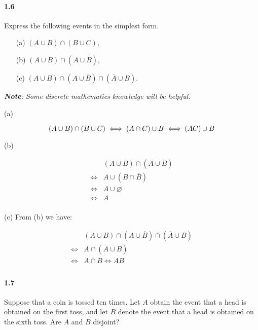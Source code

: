 \paragraph{1.6}
Express the following events in the simplest form.
\begin{itemize}
    \item[(a)] $(A\cup B)\cap (B\cup C)$,
    \item[(b)] $(A\cup B)\cap (A\cup \overline{B})$,
    \item[(c)] $(A\cup B)\cap (A\cup \overline{B})\cap (\overline{A}\cup B)$.
\end{itemize}

\begin{solution}

\textit{\textbf{Note}: Some discrete mathematics knowledge will be helpful.\cite{ISBN9781259676512}}

(a)

\begin{equation*}
    (A\cup B)\cap (B\cup C)\iff (A\cap C)\cup B\iff (AC)\cup B\\
\end{equation*}

(b)

\begin{align*}
    & (A\cup B)\cap (A\cup \overline{B})\\
    \iff & A\cup (B\cap \overline{B})\\
    \iff & A\cup \varnothing\\
    \iff & A\\
\end{align*}

(c) From (b) we have:

\begin{align*}
    & (A\cup B)\cap (A\cup \overline{B})\cap (\overline{A}\cup B)\\
    \iff & A\cap (\overline{A}\cup B)\\
    \iff & A\cap B\iff AB\\
\end{align*}

\end{solution}

\paragraph{1.7}
Suppose that a coin is tossed ten times. Let $A$ obtain the event that a head is obtained on the first toss, and let $B$ denote the event that a head is obtained on the sixth toss. Are $A$ and $B$ disjoint?


